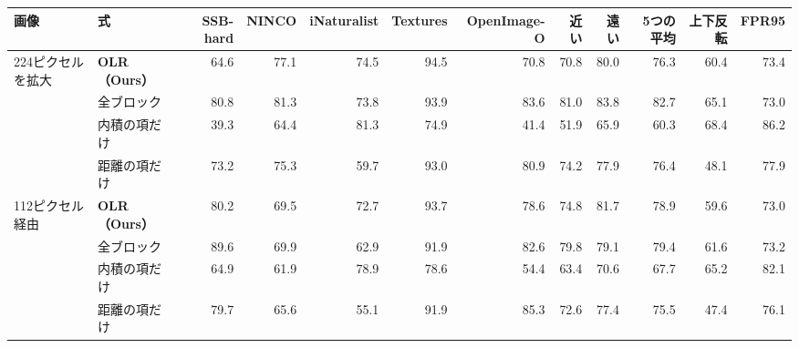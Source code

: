 \documentclass[border=3pt]{standalone}
\begin{document}
%
\begin{tabular}{ll*{5}{r}rrrrr}%
\toprule
画像 & 式 & SSB-hard & NINCO & iNaturalist & Textures & OpenImage-O & 近い & 遠い & 5つの平均 & 上下反転 & FPR95\\
\midrule
224ピクセルを拡大 & \textbf{OLR（Ours）} & 64.6 & 77.1 & 74.5 & 94.5 & 70.8 & 70.8 & 80.0 & 76.3 & 60.4 & 73.4\\
 & 全ブロック & 80.8 & 81.3 & 73.8 & 93.9 & 83.6 & 81.0 & 83.8 & 82.7 & 65.1 & 73.0\\
 & 内積の項だけ & 39.3 & 64.4 & 81.3 & 74.9 & 41.4 & 51.9 & 65.9 & 60.3 & 68.4 & 86.2\\
 & 距離の項だけ & 73.2 & 75.3 & 59.7 & 93.0 & 80.9 & 74.2 & 77.9 & 76.4 & 48.1 & 77.9\\
\midrule
112ピクセル経由 & \textbf{OLR（Ours）} & 80.2 & 69.5 & 72.7 & 93.7 & 78.6 & 74.8 & 81.7 & 78.9 & 59.6 & 73.0\\
 & 全ブロック & 89.6 & 69.9 & 62.9 & 91.9 & 82.6 & 79.8 & 79.1 & 79.4 & 61.6 & 73.2\\
 & 内積の項だけ & 64.9 & 61.9 & 78.9 & 78.6 & 54.4 & 63.4 & 70.6 & 67.7 & 65.2 & 82.1\\
 & 距離の項だけ & 79.7 & 65.6 & 55.1 & 91.9 & 85.3 & 72.6 & 77.4 & 75.5 & 47.4 & 76.1\\
\bottomrule
\end{tabular}%
\end{document}
